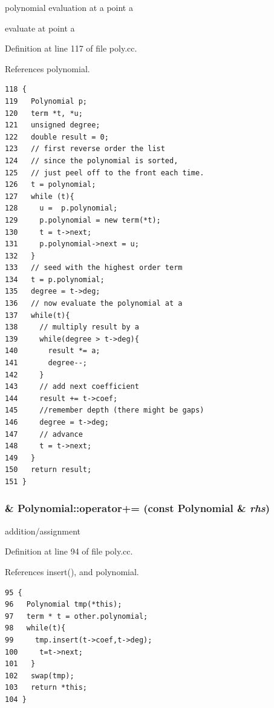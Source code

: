 polynomial evaluation at a point a

evaluate at point a 

Definition at line 117 of file poly.cc.

References polynomial.

\begin{Code}\begin{verbatim}118 {
119   Polynomial p;
120   term *t, *u;
121   unsigned degree;
122   double result = 0;
123   // first reverse order the list
124   // since the polynomial is sorted,
125   // just peel off to the front each time.
126   t = polynomial;
127   while (t){
128     u =  p.polynomial;
129     p.polynomial = new term(*t);
130     t = t->next;
131     p.polynomial->next = u;
132   }
133   // seed with the highest order term
134   t = p.polynomial;
135   degree = t->deg;
136   // now evaluate the polynomial at a
137   while(t){
138     // multiply result by a
139     while(degree > t->deg){
140       result *= a;
141       degree--;
142     }
143     // add next coefficient
144     result += t->coef;
145     //remember depth (there might be gaps)
146     degree = t->deg;
147     // advance
148     t = t->next;
149   }
150   return result;
151 }
\end{verbatim}
\end{Code}


\hypertarget{classPolynomial_2ceb25a673d4c03b346595639ade0981}{
\subsubsection[operator+=]{ \& Polynomial::operator+= (const {\bf Polynomial} \& {\em rhs})}}
\label{classPolynomial_2ceb25a673d4c03b346595639ade0981}


addition/assignment 

Definition at line 94 of file poly.cc.

References insert(), and polynomial.

\begin{Code}\begin{verbatim}95 {
96   Polynomial tmp(*this);
97   term * t = other.polynomial;
98   while(t){
99     tmp.insert(t->coef,t->deg);
100     t=t->next;
101   }
102   swap(tmp);
103   return *this;
104 }
\end{verbatim}
\end{Code}




